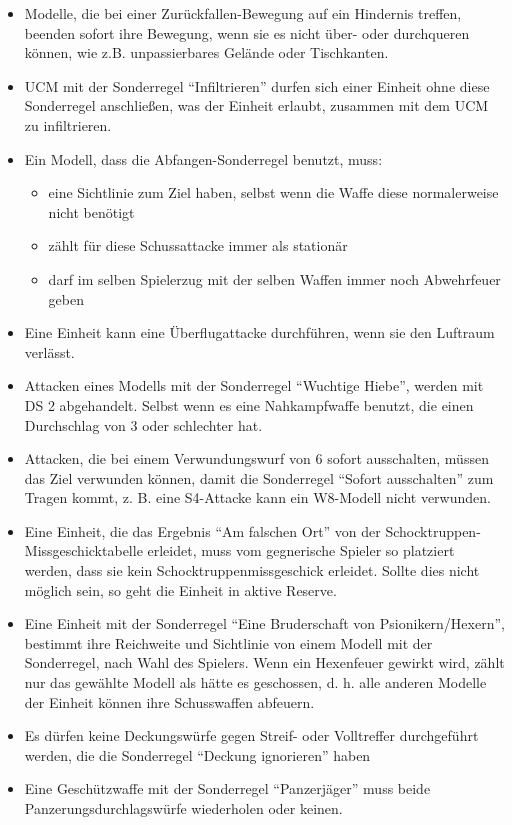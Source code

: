 \begin{itemize}

 \item Modelle, die bei einer Zurückfallen-Bewegung auf ein Hindernis treffen,
  beenden sofort ihre Bewegung, wenn sie es nicht über- oder durchqueren können,
  wie z.B.  unpassierbares Gelände oder Tischkanten.

 \item UCM mit der Sonderregel ``Infiltrieren'' durfen sich einer Einheit ohne
  diese Sonderregel anschließen, was der Einheit erlaubt, zusammen mit dem UCM
  zu infiltrieren.

 \item Ein Modell, dass die Abfangen-Sonderregel benutzt, muss:
\begin{itemize}
 \item eine Sichtlinie zum Ziel haben, selbst wenn die Waffe diese normalerweise
  nicht benötigt
 \item zählt für diese Schussattacke immer als stationär
 \item darf im selben Spielerzug mit der selben Waffen immer noch Abwehrfeuer
  geben
\end{itemize}

\item Eine Einheit kann eine Überflugattacke durchführen, wenn sie den Luftraum
 verlässt.

\item Attacken eines Modells mit der Sonderregel ``Wuchtige Hiebe'', werden mit DS
 2 abgehandelt. Selbst wenn es eine Nahkampfwaffe benutzt, die einen Durchschlag
 von 3 oder schlechter hat.

\item Attacken, die bei einem Verwundungswurf von 6 sofort ausschalten, müssen
 das Ziel verwunden können, damit die Sonderregel ``Sofort ausschalten'' zum
 Tragen kommt, z. B. eine S4-Attacke kann ein W8-Modell nicht verwunden.

\item Eine Einheit, die das Ergebnis ``Am falschen Ort'' von der
 Schocktruppen-Missgeschicktabelle erleidet, muss vom gegnerische Spieler so
 platziert werden, dass sie kein Schocktruppenmissgeschick erleidet. Sollte dies
 nicht möglich sein, so geht die Einheit in aktive Reserve.

\item Eine Einheit mit der Sonderregel ``Eine Bruderschaft von
 Psionikern/Hexern'', bestimmt ihre Reichweite und Sichtlinie von einem Modell
 mit der Sonderregel, nach Wahl des Spielers. Wenn ein Hexenfeuer gewirkt wird,
 zählt nur das gewählte Modell als hätte es geschossen, d. h. alle anderen
 Modelle der Einheit können ihre Schusswaffen abfeuern.

\item Es dürfen keine Deckungswürfe gegen Streif- oder Volltreffer durchgeführt
 werden, die die Sonderregel ``Deckung ignorieren'' haben

\item Eine Geschützwaffe mit der Sonderregel ``Panzerjäger'' muss beide
 Panzerungsdurchlagswürfe wiederholen oder keinen.

\end{itemize}

